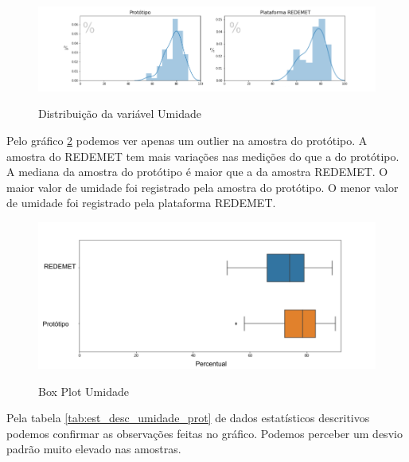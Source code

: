 \newpage

\begin{figure} [!h]
    \centering
    \caption{Distribuição da variável Umidade}
    \includegraphics [scale = 0.5] {Figuras/dist_umidade.png}
    \label{fig:dist_umidade}
\end{figure}

Pelo gráfico \ref{fig:box_plot_umidade} podemos ver apenas um outlier na amostra do protótipo. A amostra do REDEMET tem mais variações nas medições do que a do protótipo. A mediana da amostra do protótipo é maior que a da amostra REDEMET. O maior valor de umidade foi registrado pela amostra do protótipo. O menor valor de umidade foi registrado pela plataforma REDEMET.

\begin{figure} [!h]
    \centering
    \caption{Box Plot Umidade}
    \includegraphics [scale = 0.5] {Figuras/box_plot_umidade.png}
    \label{fig:box_plot_umidade}
\end{figure}

Pela tabela \ref{tab:est_desc_umidade_prot} de dados estatísticos descritivos  podemos confirmar as observações feitas no gráfico. Podemos perceber um desvio padrão muito elevado nas amostras.

